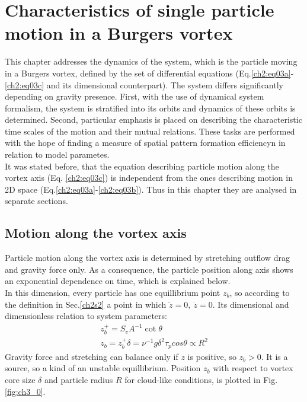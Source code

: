 \documentclass[../main.tex]{subfiles}
\begin{document}
\chapter{Characteristics of single particle motion in a Burgers vortex} %

\label{ch:single} %

This chapter addresses the dynamics of the system, which is the particle moving in a Burgers vortex, defined by the set of differential equations (Eq.\ref{ch2:eq03a}-\ref{ch2:eq03c} and its dimensional counterpart). The system differs significantly depending on gravity presence. First, with the use of dynamical system formalism, the system is stratified into its orbits and dynamics of these orbits is determined. Second, particular emphasis is placed on describing the characteristic time scales of the motion and their mutual relations. These tasks are performed with the hope of finding a measure of spatial pattern formation efficiencyn in relation to model parametes.\\
It was stated before, that the equation describing particle motion along the vortex axis (Eq. \ref{ch2:eq03c}) is independent from the ones describing motion in 2D space (Eq.\ref{ch2:eq03a}-\ref{ch2:eq03b}). Thus in this chapter they are analysed in separate sections.
 
\section{Motion along the vortex axis}
Particle motion along the vortex axis is determined by stretching outflow drag and gravity force only. As a consequence, the particle position along axis shows an exponential dependence on time, which is explained below.\\
In this dimension, every particle has one equillibrium point $z_b$, so according to the definition in Sec.\ref{ch2s2} a point in which $\ddot{z}=0,\ \dot{z}=0$. Its dimensional and dimensionless relation to system parameters:
\begin{align}
z^+_b=S_v A^{-1} \cot\theta\\
z_b=z^+_b \delta=\nu^{-1}g \delta^2 \tau_p cos\theta \propto R^2
\label{def:z_b}
\end{align}
Gravity force and stretching can balance only if $z$ is positive, so $z_b>0$. It is a source, so a kind of an unstable equillibrium. Position $z_b$ with respect to vortex core size $\delta$ and particle radius $R$ for cloud-like conditions, is plotted in Fig.\ref{fig:ch3_0}.
\end{document}
